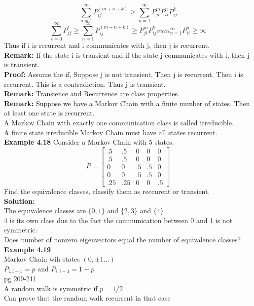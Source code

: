 \documentclass{article}
\begin{document}
$$ \sum_{n=1}^{\infty}P_{ij}^{(m+n+k)} \geq \sum_{n=1}^{\infty} P_{ji}^m P_{ii}^n P_{ij}^k$$
$$\sum_{t=0}^{\infty} P_{jj}^t \geq \sum_{n=1}^{\infty}P_{ij}^{(m+n+k)} \geq P_{ji}^m P_{ij}^k sum_{n=1}^{\infty}  P_{ii}^n \geq \infty $$
Thus if i is recurrent and i communicates with j, then j is recurrent.\\
\textbf{Remark:} If the state i is transient and if the state j communicates with i, then j is transient.\\
\textbf{Proof:} 
Assume the if, Suppose j is not transient. Then j is recurrent. Then i is recurrent. This is a contradiction. Thus j is transient.\\
\textbf{Remark:} Transience and Recurrence are class properties.\\ 
\textbf{Remark:} Suppose we have a Markov Chain with a finite number of states. Then at least one state is recurrent.\\
A Markov Chain with exactly one communication class is called irreducible.\\
A finite state irreducible Markov Chain must have all states recurrent.\\
\textbf{Example 4.18}
Consider a Markov Chain with 5 states.\\
$$P = \begin{bmatrix}
    .5 & .5 & 0 & 0 & 0 \\
    .5 & .5 & 0 & 0 & 0 \\
    0 & 0 & .5 & .5 & 0 \\
    0 & 0 & .5 & .5 & 0 \\
    .25 & .25 & 0 & 0 & .5
\end{bmatrix}$$
Find the equivalence classes, classify them as reccurent or transient.\\
\textbf{Solution:}\\
The equivalence classes are $\{0,1\}$ and $\{2,3\}$ and $\{4\}$\\
4 is its own class due to the fact the communication between 0 and 1 is not symmetric.\\
Does number of nonzero eigenvectors equal the number of equivalence classes?\\
\textbf{Example 4.19}\\
Markov Chain wih states $(0,\pm 1 \dots)$\\
$P_{i,i+1} = p$ and $P_{i,i-1} = 1-p$\\
pg 209-211 \\
A random walk is symmetric if $p = 1/2$\\
Can prove that the random walk recurrent in that case
\end{document}
